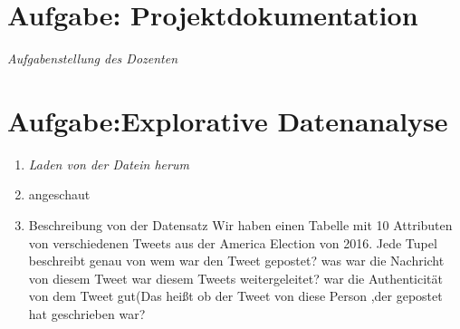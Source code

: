 
\newcommand{\dozent}{Prof.  Dr.  Agnès Voisard, Nicolas Lehmann}					%
\newcommand{\tutor}{Hoffman Christian}						%
\newcommand{\tutoriumNo}{Tutorium 3}				%
\newcommand{\projectNo}{1}									%
\newcommand{\veranstaltung}{Datenbank Systeme}	%
\newcommand{\semester}{SoeSe 2017}						%
\newcommand{\studenten}{IngridTchilibou,Emil,Boyan Hristov}			%





\section{Aufgabe: Projektdokumentation}
{\itshape Aufgabenstellung des Dozenten}



\section{Aufgabe:Explorative Datenanalyse}
\begin{enumerate}[1)]
\item {\itshape Laden von der Datein herum}
\item{angeschaut}
\item{Beschreibung von der Datensatz}
Wir haben einen Tabelle mit 10 Attributen von verschiedenen Tweets aus der America Election von 2016. Jede Tupel beschreibt genau von wem war den Tweet gepostet? was war die Nachricht von diesem Tweet war diesem Tweets weitergeleitet? war die Authenticität von dem Tweet gut(Das heißt ob der Tweet von diese Person ,der gepostet hat geschrieben war?

\end{enumerate}
	

